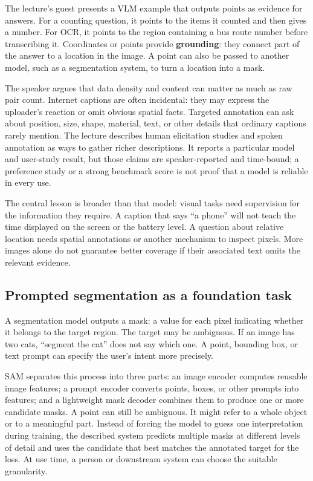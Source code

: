 \hypertarget{04-visual-computing-ii-ch031-data-quality-and-visual-grounding}{}

The lecture's guest presents a VLM example that outputs points as evidence for answers. For a counting question, it points to the items it counted and then gives a number. For OCR, it points to the region containing a bus route number before transcribing it. Coordinates or points provide \textbf{grounding}: they connect part of the answer to a location in the image. A point can also be passed to another model, such as a segmentation system, to turn a location into a mask.

The speaker argues that data density and content can matter as much as raw pair count. Internet captions are often incidental: they may express the uploader's reaction or omit obvious spatial facts. Targeted annotation can ask about position, size, shape, material, text, or other details that ordinary captions rarely mention. The lecture describes human elicitation studies and spoken annotation as ways to gather richer descriptions. It reports a particular model and user-study result, but those claims are speaker-reported and time-bound; a preference study or a strong benchmark score is not proof that a model is reliable in every use.

The central lesson is broader than that model: visual tasks need supervision for the information they require. A caption that says ``a phone'' will not teach the time displayed on the screen or the battery level. A question about relative location needs spatial annotations or another mechanism to inspect pixels. More images alone do not guarantee better coverage if their associated text omits the relevant evidence.

\subsection{Prompted segmentation as a foundation task}\label{04-visual-computing-ii-ch031-prompted-segmentation-as-a-foundation-task}

\hypertarget{04-visual-computing-ii-ch031-prompted-segmentation-as-a-foundation-task}{}

A segmentation model outputs a mask: a value for each pixel indicating whether it belongs to the target region. The target may be ambiguous. If an image has two cats, ``segment the cat'' does not say which one. A point, bounding box, or text prompt can specify the user's intent more precisely.

SAM separates this process into three parts: an image encoder computes reusable image features; a prompt encoder converts points, boxes, or other prompts into features; and a lightweight mask decoder combines them to produce one or more candidate masks. A point can still be ambiguous. It might refer to a whole object or to a meaningful part. Instead of forcing the model to guess one interpretation during training, the described system predicts multiple masks at different levels of detail and uses the candidate that best matches the annotated target for the loss. At use time, a person or downstream system can choose the suitable granularity.

